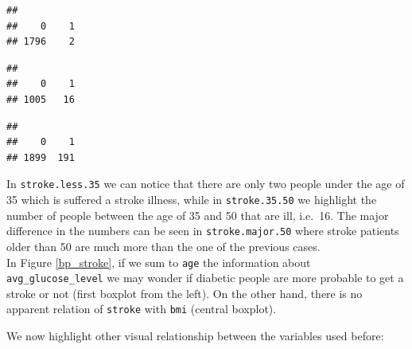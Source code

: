 \documentclass[
]{article}
\newenvironment{Shaded}{\begin{snugshade}}{\end{snugshade}}
\newcommand{\DecValTok}[1]{\textcolor[rgb]{0.00,0.00,0.81}{#1}}
\newcommand{\FloatTok}[1]{\textcolor[rgb]{0.00,0.00,0.81}{#1}}
\newcommand{\FunctionTok}[1]{\textcolor[rgb]{0.00,0.00,0.00}{#1}}
\newcommand{\NormalTok}[1]{#1}
\newcommand{\OtherTok}[1]{\textcolor[rgb]{0.56,0.35,0.01}{#1}}
\newcommand{\SpecialCharTok}[1]{\textcolor[rgb]{0.00,0.00,0.00}{#1}}
\newcommand{\StringTok}[1]{\textcolor[rgb]{0.31,0.60,0.02}{#1}}
\begin{document}
\begin{verbatim}
## 
##    0    1 
## 1796    2
\end{verbatim}

\begin{Shaded}
\end{Shaded}

\begin{verbatim}
## 
##    0    1 
## 1005   16
\end{verbatim}

\begin{Shaded}
\end{Shaded}

\begin{verbatim}
## 
##    0    1 
## 1899  191
\end{verbatim}

In \texttt{stroke.less.35} we can notice that there are only two people
under the age of 35 which is suffered a stroke illness, while in
\texttt{stroke.35.50} we highlight the number of people between the age
of 35 and 50 that are ill, i.e.~16. The major difference in the numbers
can be seen in \texttt{stroke.major.50} where stroke patients older than
50 are much more than the one of the previous cases.\\
In Figure \ref{bp_stroke}, if we sum to \texttt{age} the information
about \texttt{avg\_glucose\_level} we may wonder if diabetic people are
more probable to get a stroke or not (first boxplot from the left). On
the other hand, there is no apparent relation of \texttt{stroke} with
\texttt{bmi} (central boxplot).

We now highlight other visual relationship between the variables used
before:
\end{document}
